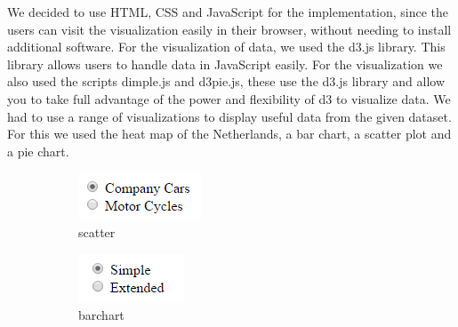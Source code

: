 \documentclass[a4paper,twoside,11pt]{article}
\begin{document}
We decided to use HTML, CSS and JavaScript for the implementation, since the users can visit the visualization easily in their browser, without needing to install additional software. \newline
For the visualization of data, we used the d3.js library. This library allows users to handle data in JavaScript easily. For the visualization we also used the scripts dimple.js and d3pie.js, these use the d3.js library and allow you to take full advantage of the power and flexibility of d3 to visualize data. \newline
We had to use a range of visualizations to display useful data from the given dataset. For this we used the heat map of the Netherlands, a bar chart, a scatter plot and a pie chart. \newline
\begin{figure}
        \centering
        \begin{subfigure}[h]{0.12\textwidth}
                \includegraphics[width=\textwidth]{Interface/ScatterInterface.png}
                \caption{scatter}
        \end{subfigure}
        \begin{subfigure}[h]{0.12\textwidth}
                \includegraphics[width=\textwidth]{Interface/BarInterface.png}
                \caption{barchart}
        \end{subfigure}
        \begin{subfigure}[h]{0.12\textwidth}

\end{subfigure}
\end{figure}
\end{document}
